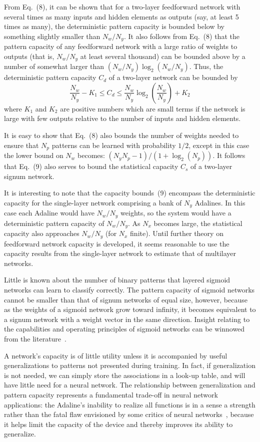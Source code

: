 \documentclass[10pt,twocolumn]{article}
\begin{document}
From Eq.~(8), it can be shown that for a two-layer feedforward network with
several times as many inputs and hidden elements as outputs (say, at least 5
times as many), the deterministic pattern capacity is bounded below by something
slightly smaller than $N_w/N_y$. It also follows from Eq.~(8) that the pattern
capacity of any feedforward network with a large ratio of weights to outputs
(that is, $N_w/N_y$ at least several thousand) can be bounded above by a number of
somewhat larger than $(N_w/N_y)\log_2(N_w/N_y)$. Thus, the deterministic pattern
capacity $C_d$ of a two-layer network can be bounded by
\begin{equation}
\frac{N_w}{N_y}-K_1 \le C_d \le \frac{N_w}{N_y}\log_2\!\left(\frac{N_w}{N_y}\right)+K_2 \tag{9}
\end{equation}
where $K_1$ and $K_2$ are positive numbers which are small terms if the network
is large with few outputs relative to the number of inputs and hidden elements.

It is easy to show that Eq.~(8) also bounds the number of weights needed to
ensure that $N_p$ patterns can be learned with probability $1/2$, except in this
case the lower bound on $N_w$ becomes: $(N_y N_p - 1)/(1 + \log_2(N_p))$. It
follows that Eq.~(9) also serves to bound the statistical capacity $C_s$ of a
two-layer signum network.

It is interesting to note that the capacity bounds~(9) encompass the
deterministic capacity for the single-layer network comprising a bank of $N_y$
Adalines. In this case each Adaline would have $N_w/N_y$ weights, so the system
would have a deterministic pattern capacity of $N_w/N_y$. As $N_x$ becomes large,
the statistical capacity also approaches $N_w/N_y$ (for $N_x$ finite). Until
further theory on feedforward network capacity is developed, it seems reasonable
to use the capacity results from the single-layer network to estimate that of
multilayer networks.

Little is known about the number of binary patterns that layered sigmoid networks
can learn to classify correctly. The pattern capacity of sigmoid networks cannot
be smaller than that of signum networks of equal size, however, because as the
weights of a sigmoid network grow toward infinity, it becomes equivalent to a
signum network with a weight vector in the same direction. Insight relating to
the capabilities and operating principles of sigmoid networks can be winnowed
from the literature~\cite{lapedes,cybenko89,baumhaussler}.

A network's capacity is of little utility unless it is accompanied by useful
generalizations to patterns not presented during training. In fact, if
generalization is not needed, we can simply store the associations in a look-up
table, and will have little need for a neural network. The relationship between
generalization and pattern capacity represents a fundamental trade-off in neural
network applications: the Adaline's inability to realize all functions is in a
sense a strength rather than the fatal flaw envisioned by some critics of neural
networks~\cite{minsky}, because it helps limit the capacity of the device and
thereby improves its ability to generalize.
\end{document}
